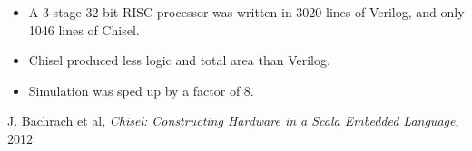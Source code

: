 \documentclass{beamer}
\begin{document}
\begin{frame}
\begin{itemize}

\item A 3-stage 32-bit RISC processor was written in 3020 lines of Verilog, and only 1046 lines of Chisel.

\item Chisel produced less logic and total area than Verilog.

\item Simulation was sped up by a factor of 8.

\end{itemize}
\end{frame}

\begin{thebibliography}{9}

	J. Bachrach et al,
	\emph{Chisel: Constructing Hardware in a Scala Embedded Language},
	2012

\end{thebibliography}
\end{document}
